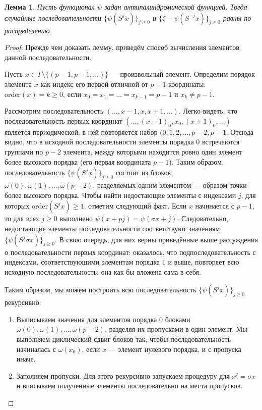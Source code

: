 \documentclass[14pt, a4paper, russian]{report}
\newtheorem{lemma}{\indent Лемма}
\begin{document}
\begin{lemma}\label{antipalindromic_lemma}
Пусть функционал $\psi$ задан антипалиндромической функцией. Тогда случайные последовательности $\{\psi(S^j x)\}_{j \ge 0}$ и $\{ \zeta - \psi(S^{-j} x)\}_{j \ge 0}$ равны по распределению. 
\end{lemma}
\begin{proof}
Прежде чем доказать лемму, приведём способ вычисления элементов данной последовательности.

Пусть $x \in \Gamma \setminus \{(p-1,p-1,\ldots)\}$ --- произвольный элемент. Определим порядок элемента $x$ как индекс его первой отличной от $p-1$ координаты: $\mathrm{order}(x) = k \ge 0$, если  $x_0=x_1=\ldots=x_{k-1}=p-1$ и $x_k \ne p-1$.

Рассмотрим последовательность $(\ldots, x-1,x,x+1, \ldots)$.  Легко видеть, что последовательность первых координат $(\ldots, (x-1)_0,x_0,(x+1)_0, \ldots)$ является периодической: в ней повторяется набор
$(0, 1, 2, \ldots,p-2, p-1$. Отсюда видно, что в исходной последовательности элементы порядка $0$ встречаются группами по $p-2$ элемента, между которыми находится ровно один элемент более высокого порядка (его первая координата $p-1$). Таким образом, последовательность
$\{\psi(S^j x)\}_{j \ge 0}$ состоит из блоков $\omega(0),\omega(1),\ldots, \omega(p-2)$, разделяемых одним элементом --- образом точки более высокого порядка. Чтобы найти недостающие элементы с индексами $j$, для которых $\mathrm{order}(S^j x) \ge 1$, отметим следующий факт. Если $x$ начинается с $p-1$, то для всех $j \ge 0$ выполнено $\psi(x+pj)=\psi(\sigma x + j)$. Следовательно, недостающие элементы последовательности соответствуют значениям $\{\psi(S^j \sigma x)\}_{j \ge 0}$. В свою очередь, для них верны приведённые выше рассуждения о последовательности первых координат: оказалось, что подпоследовательность с индексами, соответствующими элементам порядка $1$ и выше, повторяет всю исходную последовательность: она как бы вложена сама в себя.

Таким образом, мы можем построить всю последовательность $\{\psi(S^j x)\}_{j \ge 0}$ рекурсивно:
\begin{enumerate}
\item Выписываем значения для элементов порядка $0$ блоками $\omega(0),\omega(1),\ldots, \omega(p-2)$, разделяя их пропусками в один элемент. Мы выполняем циклический сдвиг блоков так, чтобы последовательность начиналась с $\omega(x_0)$, если $x$ --- элемент нулевого порядка, и с пропуска иначе.
\item Заполняем пропуски. Для этого рекурсивно запускаем процедуру для $x' = \sigma x$ и вписываем полученные элементы последовательно на места пропусков.


\end{enumerate}
\end{proof}
\end{document}
